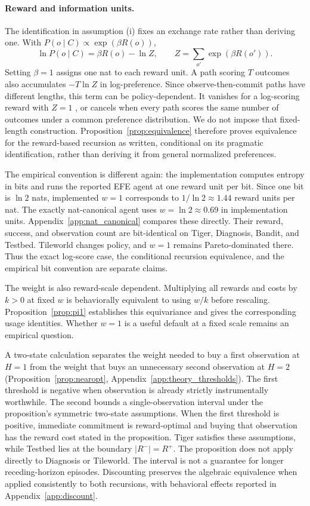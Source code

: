 \documentclass[manuscript, screen, review]{jair}
\begin{document}
\paragraph{Reward and information units.}
The identification in assumption (i) fixes an exchange rate rather than deriving one. With $P(o\mid C)\propto\exp(\beta R(o))$,
\[
\ln P(o\mid C)=\beta R(o)-\ln Z,\qquad Z=\sum_{o'}\exp(\beta R(o')).
\]
Setting $\beta=1$ assigns one nat to each reward unit. A path scoring $T$ outcomes also accumulates $-T\ln Z$ in log-preference. Since observe-then-commit paths have different lengths, this term can be policy-dependent. It vanishes for a log-scoring reward with $Z=1$ \citep{bernardo1979}, or cancels when every path scores the same number of outcomes under a common preference distribution. We do not impose that fixed-length construction. Proposition~\ref{prop:equivalence} therefore proves equivalence for the reward-based recursion as written, conditional on its pragmatic identification, rather than deriving it from general normalized preferences.

The empirical convention is different again: the implementation computes entropy in bits and runs the reported EFE agent at one reward unit per bit. Since one bit is $\ln 2$ nats, implemented $w=1$ corresponds to $1/\ln 2\approx1.44$ reward units per nat. The exactly nat-canonical agent uses $w=\ln 2\approx0.69$ in implementation units. Appendix~\ref{app:nat_canonical} compares these directly. Their reward, success, and observation count are bit-identical on Tiger, Diagnosis, Bandit, and Testbed. Tileworld changes policy, and $w=1$ remains Pareto-dominated there. Thus the exact log-score case, the conditional recursion equivalence, and the empirical bit convention are separate claims.

The weight is also reward-scale dependent. Multiplying all rewards and costs by $k>0$ at fixed $w$ is behaviorally equivalent to using $w/k$ before rescaling. Proposition~\ref{prop:pi1} establishes this equivariance and gives the corresponding usage identities. Whether $w=1$ is a useful default at a fixed scale remains an empirical question.

A two-state calculation separates the weight needed to buy a first observation at $H=1$ from the weight that buys an unnecessary second observation at $H=2$ (Proposition~\ref{prop:nearopt}, Appendix~\ref{app:theory_thresholds}). The first threshold is negative when observation is already strictly instrumentally worthwhile. The second bounds a single-observation interval under the proposition's symmetric two-state assumptions. When the first threshold is positive, immediate commitment is reward-optimal and buying that observation has the reward cost stated in the proposition. Tiger satisfies these assumptions, while Testbed lies at the boundary $|R^-|=R^+$. The proposition does not apply directly to Diagnosis or Tileworld. The interval is not a guarantee for longer receding-horizon episodes. Discounting preserves the algebraic equivalence when applied consistently to both recursions, with behavioral effects reported in Appendix~\ref{app:discount}.
\end{document}
